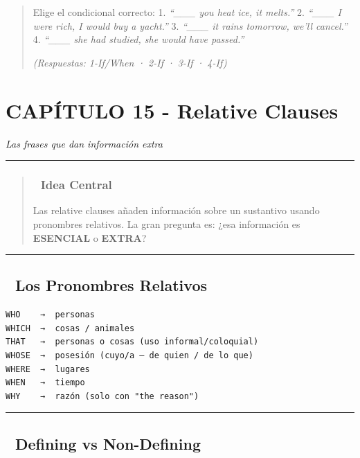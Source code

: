 \documentclass[
  spanish,
  letterpaper,
]{scrbook}
\begin{document}
\begin{quote}
Elige el condicional correcto: 1. \emph{``\_\_\_ you heat ice, it
melts.''} 2. \emph{``\_\_\_ I were rich, I would buy a yacht.''} 3.
\emph{``\_\_\_ it rains tomorrow, we'll cancel.''} 4. \emph{``\_\_\_ she
had studied, she would have passed.''}

\emph{(Respuestas: 1-If/When · 2-If · 3-If · 4-If)}
\end{quote}

\chapter{CAPÍTULO 15 - Relative
Clauses}\label{capuxedtulo-15---relative-clauses}

\emph{Las frases que dan información extra}

\begin{center}\rule{0.5\linewidth}{0.5pt}\end{center}

\begin{quote}
\subsection{🎯 Idea Central}\label{idea-central-13}

Las relative clauses añaden información sobre un sustantivo usando
pronombres relativos. La gran pregunta es: ¿esa información es
\textbf{ESENCIAL} o \textbf{EXTRA}?
\end{quote}

\begin{center}\rule{0.5\linewidth}{0.5pt}\end{center}

\section{📐 Los Pronombres Relativos}\label{los-pronombres-relativos}

\begin{verbatim}
WHO    →  personas
WHICH  →  cosas / animales
THAT   →  personas o cosas (uso informal/coloquial)
WHOSE  →  posesión (cuyo/a — de quien / de lo que)
WHERE  →  lugares
WHEN   →  tiempo
WHY    →  razón (solo con "the reason")
\end{verbatim}

\begin{center}\rule{0.5\linewidth}{0.5pt}\end{center}

\section{📐 Defining vs Non-Defining}\label{defining-vs-non-defining}
\end{document}
